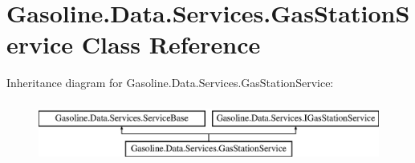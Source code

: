 \hypertarget{class_gasoline_1_1_data_1_1_services_1_1_gas_station_service}{}\section{Gasoline.\+Data.\+Services.\+Gas\+Station\+Service Class Reference}
\label{class_gasoline_1_1_data_1_1_services_1_1_gas_station_service}
Inheritance diagram for Gasoline.\+Data.\+Services.\+Gas\+Station\+Service\+:\begin{figure}[H]
\begin{center}
\leavevmode
\includegraphics[height=2.000000cm]{class_gasoline_1_1_data_1_1_services_1_1_gas_station_service}
\end{center}
\end{figure}
